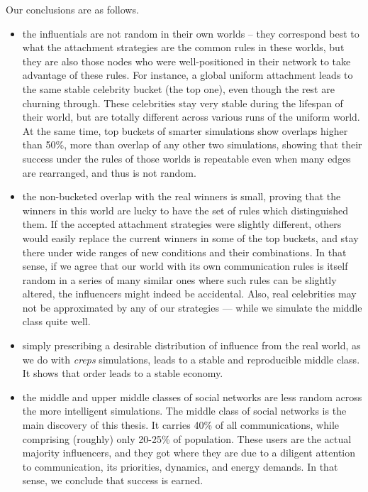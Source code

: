 \documentclass[10pt,oneside]{memoir}
\begin{document}
\begin{Spacing}{2}
Our conclusions are as follows.


\begin{itemize}


\item the influentials are not random in their own worlds -- they correspond best to what the attachment strategies are the common rules in these worlds, but they are also those nodes who were well-positioned in their network to take advantage of these rules.  For instance, a global uniform attachment leads to the same stable celebrity bucket (the top one), even though the rest are churning through.  These celebrities stay very stable during the lifespan of their world, but are totally different across various runs of the uniform world.  At the same time, top buckets of smarter simulations show overlaps higher than 50\%, more than overlap of any other two simulations, showing that their success under the rules of those worlds is repeatable even when many edges are rearranged, and thus is not random.




\item the non-bucketed overlap with the real winners is small, proving that the winners in this world are lucky to have the set of rules which distinguished them.  If the accepted attachment strategies were slightly different, others would easily replace the current winners in some of the top buckets, and stay there under wide ranges of new conditions and their combinations.  In that sense, if we agree that our world with its own communication rules is itself random in a series of many similar ones where such rules can be slightly altered, the influencers might indeed be accidental.   Also, real celebrities may not be approximated by any of our strategies --- while we simulate the middle class quite well.




\item simply prescribing a desirable distribution of influence from the real world, as we do with {\itshape creps} simulations, leads to a stable and reproducible middle class.  It shows that order leads to a stable economy.




\item the middle and upper middle classes of social networks are less random across the more intelligent simulations.  The middle class of social networks is the main discovery of this thesis.  It carries 40\% of all communications, while comprising (roughly) only 20-25\% of population.  These users are the actual majority influencers, and they got where they are due to a diligent attention to communication, its priorities, dynamics, and energy demands.  In that sense, we conclude that success is earned.





\end{itemize}
\end{Spacing}
\end{document}
